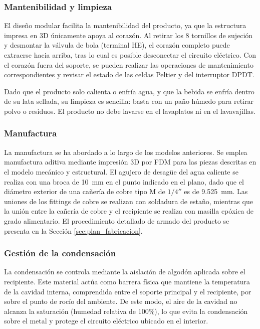 \documentclass[12pt, a4paper]{article}
\begin{document}
\subsubsection{Mantenibilidad y limpieza}

El diseño modular facilita la mantenibilidad del producto, ya que la estructura impresa en 3D únicamente apoya al corazón. Al retirar los 8 tornillos de sujeción y desmontar la válvula de bola (terminal HE), el corazón completo puede extraerse hacia arriba, tras lo cual es posible desconectar el circuito eléctrico. Con el corazón fuera del soporte, se pueden realizar las operaciones de mantenimiento correspondientes y revisar el estado de las celdas Peltier y del interruptor DPDT.

Dado que el producto solo calienta o enfría agua, y que la bebida se enfría dentro de su lata sellada, su limpieza es sencilla: basta con un paño húmedo para retirar polvo o residuos. El producto no debe lavarse en el lavaplatos ni en el lavavajillas.

\subsubsection{Manufactura}

La manufactura se ha abordado a lo largo de los modelos anteriores. Se emplea manufactura aditiva mediante impresión 3D por FDM para las piezas descritas en el modelo mecánico y estructural. El agujero de desagüe del agua caliente se realiza con una broca de \SI{10}{\mm} en el punto indicado en el plano, dado que el diámetro exterior de una cañería de cobre tipo M de $1/4''$ es de \SI{9,525}{\mm}. Las uniones de los fittings de cobre se realizan con soldadura de estaño, mientras que la unión entre la cañería de cobre y el recipiente se realiza con masilla epóxica de grado alimentario. El procedimiento detallado de armado del producto se presenta en la Sección \ref{sec:plan_fabricacion}.

\subsubsection{Gestión de la condensación}

La condensación se controla mediante la aislación de algodón aplicada sobre el recipiente. Este material actúa como barrera física que mantiene la temperatura de la cavidad interna, comprendida entre el soporte principal y el recipiente, por sobre el punto de rocío del ambiente. De este modo, el aire de la cavidad no alcanza la saturación (humedad relativa de 100\%), lo que evita la condensación sobre el metal y protege el circuito eléctrico ubicado en el interior.
\end{document}
